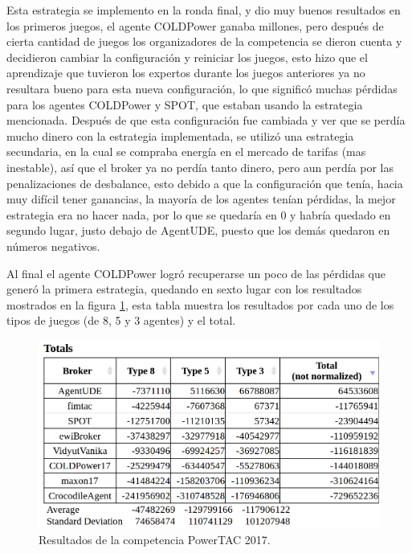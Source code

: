 Esta estrategia se implemento en la ronda final, y dio muy buenos resultados en los primeros juegos, el agente COLDPower ganaba millones, pero después de cierta cantidad de juegos los organizadores de la competencia se dieron cuenta y decidieron cambiar la configuración y reiniciar los juegos, esto hizo que el aprendizaje que tuvieron los expertos durante los juegos anteriores ya no resultara bueno para esta nueva configuración, lo que significó muchas pérdidas para los agentes COLDPower y SPOT, que estaban usando la estrategia mencionada.
Después de que esta configuración fue cambiada y ver que se perdía mucho dinero con la estrategia implementada, se utilizó una estrategia secundaria, en la cual se compraba energía en el mercado de tarifas (mas inestable), así que el broker ya no perdía tanto dinero, pero aun perdía por las penalizaciones de desbalance, esto debido a que la configuración que tenía, hacia muy difícil tener ganancias, la mayoría de los agentes tenían pérdidas, la mejor estrategia era no hacer nada, por lo que se quedaría en 0 y habría quedado en segundo lugar, justo debajo de AgentUDE, puesto que los demás quedaron en números negativos.

Al final el agente COLDPower logró recuperarse un poco de las pérdidas que generó la primera estrategia, quedando en sexto lugar con los resultados mostrados en la figura \ref{fig:resultadosCompetencia}, esta tabla muestra los resultados por cada uno de los tipos de juegos (de 8, 5 y 3 agentes) y el total.

\begin{figure}[h]
	\centering
	\includegraphics[width=17cm]{img/resultadosCompetencia.png}
	\caption{Resultados de la competencia PowerTAC 2017. }
	\label{fig:resultadosCompetencia}
\end{figure}
